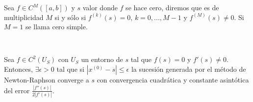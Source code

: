 \begin{definicion}
	Sea $f \in C^M([a,b])$ y $s$ valor donde $f$ se hace cero, diremos que es de multiplicidad $M$ si y sólo si $f^{(k)}(s) = 0$, $k = 0, ..., M-1$ y $f^{(M)}(s) \neq 0$. Si $M = 1$ se llama cero simple.
\end{definicion}
${ }$\\

\begin{teorema}
	Sea $f \in C^2(U_S)$ con $U_S$ un entorno de $s$ tal que $f(s) = 0$ y $f'(s) \neq 0$. Entonces, $\exists \epsilon > 0$ tal que si $|x^{(0)} - s| \leq \epsilon$ la sucesión generada por el método de Newton-Raphson converge a $s$ con convergencia cuadrática y constante asintótica del error $\frac{|f''(s)|}{2|f'(s)|}$.
\end{teorema}

